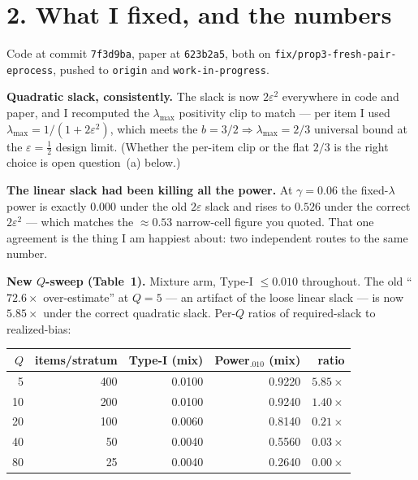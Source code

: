 \documentclass[11pt,a4paper]{article}
\begin{document}
\section*{2. What I fixed, and the numbers}

\noindent Code at commit \texttt{7f3d9ba}, paper at \texttt{623b2a5}, both on
\texttt{fix/prop3-fresh-pair-eprocess}, pushed to \texttt{origin} and
\texttt{work-in-progress}.

\medskip
\noindent\textbf{Quadratic slack, consistently.} The slack is now $2\varepsilon^2$
everywhere in code and paper, and I recomputed the $\lambda_{\max}$ positivity
clip to match --- per item I used $\lambda_{\max} = 1/(1 + 2\varepsilon^2)$, which
meets the $b = 3/2 \Rightarrow \lambda_{\max} = 2/3$ universal bound at the
$\varepsilon = \tfrac12$ design limit. (Whether the per-item clip or the flat
$2/3$ is the right choice is open question~(a) below.)

\medskip
\noindent\textbf{The linear slack had been killing all the power.} At
$\gamma = 0.06$ the fixed-$\lambda$ power is exactly $0.000$ under the old
$2\varepsilon$ slack and rises to $0.526$ under the correct $2\varepsilon^2$ ---
which matches the $\approx 0.53$ narrow-cell figure you quoted. That one agreement
is the thing I am happiest about: two independent routes to the same number.

\medskip
\noindent\textbf{New $Q$-sweep (Table~1).} Mixture arm, Type-I $\le 0.010$
throughout. The old ``$72.6\times$ over-estimate'' at $Q = 5$ --- an artifact of
the loose linear slack --- is now $5.85\times$ under the correct quadratic slack.
Per-$Q$ ratios of required-slack to realized-bias:

\medskip
\begin{center}
\setlength{\tabcolsep}{7pt}
\begin{tabular}{rrrrr}
\toprule
$Q$ & items/stratum & Type-I (mix) & Power$_{.010}$ (mix) & ratio \\
\midrule
 5 & 400 & 0.0100 & 0.9220 & $5.85\times$ \\
10 & 200 & 0.0100 & 0.9240 & $1.40\times$ \\
20 & 100 & 0.0060 & 0.8140 & $0.21\times$ \\
40 &  50 & 0.0040 & 0.5560 & $0.03\times$ \\
80 &  25 & 0.0040 & 0.2640 & $0.00\times$ \\
\bottomrule
\end{tabular}
\end{center}
\medskip
\end{document}
